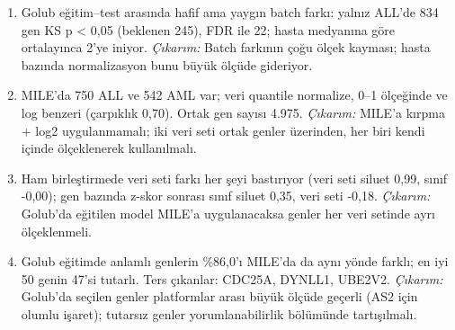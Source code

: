 \begin{enumerate}[leftmargin=*]
  \item Golub eğitim–test arasında hafif ama yaygın batch farkı: yalnız ALL'de 834 gen KS p < 0,05 (beklenen 245), FDR ile 22; hasta medyanına göre ortalayınca 2'ye iniyor. \textit{Çıkarım:} Batch farkının çoğu ölçek kayması; hasta bazında normalizasyon bunu büyük ölçüde gideriyor.
  \item MILE'da 750 ALL ve 542 AML var; veri quantile normalize, 0–1 ölçeğinde ve log benzeri (çarpıklık 0,70). Ortak gen sayısı 4.975. \textit{Çıkarım:} MILE'a kırpma + log2 uygulanmamalı; iki veri seti ortak genler üzerinden, her biri kendi içinde ölçeklenerek kullanılmalı.
  \item Ham birleştirmede veri seti farkı her şeyi bastırıyor (veri seti siluet 0,99, sınıf -0,00); gen bazında z-skor sonrası sınıf siluet 0,35, veri seti -0,18. \textit{Çıkarım:} Golub'da eğitilen model MILE'a uygulanacaksa genler her veri setinde ayrı ölçeklenmeli.
  \item Golub eğitimde anlamlı genlerin \%86,0'ı MILE'da da aynı yönde farklı; en iyi 50 genin 47'si tutarlı. Ters çıkanlar: CDC25A, DYNLL1, UBE2V2. \textit{Çıkarım:} Golub'da seçilen genler platformlar arası büyük ölçüde geçerli (AS2 için olumlu işaret); tutarsız genler yorumlanabilirlik bölümünde tartışılmalı.
\end{enumerate}
